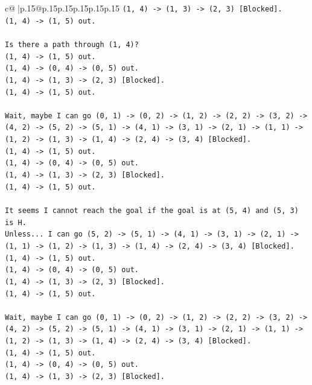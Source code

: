 \documentclass{article}
\begin{document}
{\begin{supertabular}{c@{$\;$}|p{.15\linewidth}@{}p{.15\linewidth}p{.15\linewidth}p{.15\linewidth}p{.15\linewidth}p{.15\linewidth}}
{{{\texttt{(1, 4) {-}> (1, 3) {-}> (2, 3) {[}Blocked{]}.} \\
\texttt{(1, 4) {-}> (1, 5) out.} \\
\\ 
\texttt{Is there a path through (1, 4)?} \\
\texttt{(1, 4) {-}> (1, 5) out.} \\
\texttt{(1, 4) {-}> (0, 4) {-}> (0, 5) out.} \\
\texttt{(1, 4) {-}> (1, 3) {-}> (2, 3) {[}Blocked{]}.} \\
\texttt{(1, 4) {-}> (1, 5) out.} \\
\\ 
\texttt{Wait, maybe I can go (0, 1) {-}> (0, 2) {-}> (1, 2) {-}> (2, 2) {-}> (3, 2) {-}> (4, 2) {-}> (5, 2) {-}> (5, 1) {-}> (4, 1) {-}> (3, 1) {-}> (2, 1) {-}> (1, 1) {-}> (1, 2) {-}> (1, 3) {-}> (1, 4) {-}> (2, 4) {-}> (3, 4) {[}Blocked{]}.} \\
\texttt{(1, 4) {-}> (1, 5) out.} \\
\texttt{(1, 4) {-}> (0, 4) {-}> (0, 5) out.} \\
\texttt{(1, 4) {-}> (1, 3) {-}> (2, 3) {[}Blocked{]}.} \\
\texttt{(1, 4) {-}> (1, 5) out.} \\
\\ 
\texttt{It seems I cannot reach the goal if the goal is at (5, 4) and (5, 3) is H.} \\
\texttt{Unless... I can go (5, 2) {-}> (5, 1) {-}> (4, 1) {-}> (3, 1) {-}> (2, 1) {-}> (1, 1) {-}> (1, 2) {-}> (1, 3) {-}> (1, 4) {-}> (2, 4) {-}> (3, 4) {[}Blocked{]}.} \\
\texttt{(1, 4) {-}> (1, 5) out.} \\
\texttt{(1, 4) {-}> (0, 4) {-}> (0, 5) out.} \\
\texttt{(1, 4) {-}> (1, 3) {-}> (2, 3) {[}Blocked{]}.} \\
\texttt{(1, 4) {-}> (1, 5) out.} \\
\\ 
\texttt{Wait, maybe I can go (0, 1) {-}> (0, 2) {-}> (1, 2) {-}> (2, 2) {-}> (3, 2) {-}> (4, 2) {-}> (5, 2) {-}> (5, 1) {-}> (4, 1) {-}> (3, 1) {-}> (2, 1) {-}> (1, 1) {-}> (1, 2) {-}> (1, 3) {-}> (1, 4) {-}> (2, 4) {-}> (3, 4) {[}Blocked{]}.} \\
\texttt{(1, 4) {-}> (1, 5) out.} \\
\texttt{(1, 4) {-}> (0, 4) {-}> (0, 5) out.} \\
\texttt{(1, 4) {-}> (1, 3) {-}> (2, 3) {[}Blocked{]}.} \\
}}}
\end{supertabular}}
\end{document}
